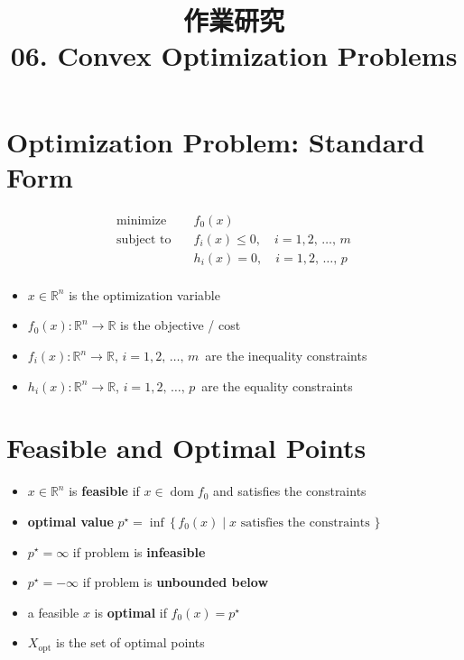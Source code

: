 \documentclass[11pt]{extarticle}
\newcommand{\ds}{\displaystyle}
\DeclareMathOperator*{\dom}{dom}
\theoremstyle{definition}
\begin{document}
\title{\texorpdfstring{\vspace{15mm} 作業研究\\ 06. Convex Optimization Problems}{作業研究\\ 06. Convex Optimization Problems}} 
\author{}
\date{}
\maketitle
\newpage

\section*{Optimization Problem: Standard Form}

\vspace{5mm}
\begin{align*}
  \text{minimize}\quad &f_0(x) \\
  \text{subject to}\quad &f_i(x)\leqslant 0, \quad i = 1, 2,\,\ldots,\,m \\
  \qquad\qquad &h_i(x) = 0, \quad i = 1, 2,\,\ldots,\,p \\
\end{align*}
\begin{itemize}
  \item $\ds x\in\mathbb{R}^n$ is the optimization variable
  \item $\ds f_0(x):\mathbb{R}^n\to\mathbb{R}$ is the objective / cost 
  \item $\ds f_i(x):\mathbb{R}^n\to\mathbb{R}$, $i = 1, 2,\,\ldots,\,m\,$ are the inequality constraints 
  \item $\ds h_i(x):\mathbb{R}^n\to\mathbb{R}$, $i = 1, 2,\,\ldots,\,p\,$ are the equality constraints 
\end{itemize}

\newpage

\section*{Feasible and Optimal Points}

\vspace{1cm}
\begin{itemize}
  \item $x\in\mathbb{R}^n$ is {\bf feasible} if $x\in\dom f_0$ and satisfies the constraints
  \item {\bf optimal value} $\ds p^\star = \inf\,\{\,f_0(x)\;|\;\text{$x$ satisfies the constraints }\}$ 
  \item $p^\star = \infty$ if problem is {\bf infeasible}
  \item $p^\star = -\infty$ if problem is {\bf unbounded below}
  \item a feasible $x$ is {\bf optimal} if $\ds f_0(x) = p^\star$
  \item $X_{\text{opt}}$ is the set of optimal points
\end{itemize}
\end{document}

